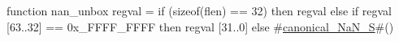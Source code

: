 function nan_unbox   regval =
  if (sizeof(flen) == 32)
  then regval
  else if regval [63..32] == 0x_FFFF_FFFF
       then regval [31..0]
       else #\hyperref[sailRISCVzcanonicalzyNaNzyS]{canonical\_NaN\_S}#()
